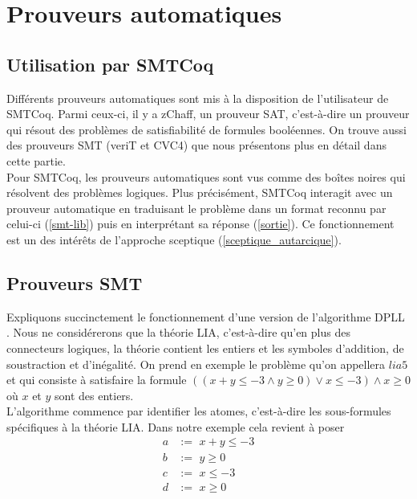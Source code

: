 \documentclass[11pt]{article}
\begin{document}
\newpage
\section{Prouveurs automatiques} \label{fonctionnement_prouveurs}

\subsection{Utilisation par SMTCoq}

Différents prouveurs automatiques sont mis à la disposition de l'utilisateur de SMTCoq. Parmi ceux-ci, il y a zChaff, un prouveur SAT, c'est-à-dire un prouveur qui résout des problèmes de satisfiabilité de formules booléennes. On trouve aussi des prouveurs SMT (veriT et CVC4) que nous présentons plus en détail dans cette partie. \\ 

Pour SMTCoq, les prouveurs automatiques sont vus comme des boîtes noires qui résolvent des problèmes logiques. Plus précisément, SMTCoq interagit avec un prouveur automatique en traduisant le problème dans un format reconnu par celui-ci (\ref{smt-lib}) puis en interprétant sa réponse (\ref{sortie}). Ce fonctionnement est un des intérêts de l'approche sceptique (\ref{sceptique_autarcique}).

\subsection{Prouveurs SMT} \label{smt}

Expliquons succinctement le fonctionnement d'une version de l'algorithme DPLL \cite{dpll}. Nous ne considérerons que la théorie LIA, c'est-à-dire qu'en plus des connecteurs logiques, la théorie contient les entiers et les symboles d'addition, de soustraction et d'inégalité. On prend en exemple le problème qu'on appellera $lia5$ et qui consiste à satisfaire la formule $((x + y \leq -3 \wedge y \geq 0) \vee x \leq -3) \wedge x \geq 0$ où $x$ et $y$ sont des entiers. \\

L'algorithme commence par identifier les atomes, c'est-à-dire les sous-formules spécifiques à la théorie LIA. Dans notre exemple cela revient à poser 
\begin{align*}
a &:= \,\, x + y \leq -3 \\
b &:=\,\, y \geq 0 \\
c &:= \,\,x \leq -3 \\
d &:= \,\,x \geq 0
\end{align*}
\end{document}
